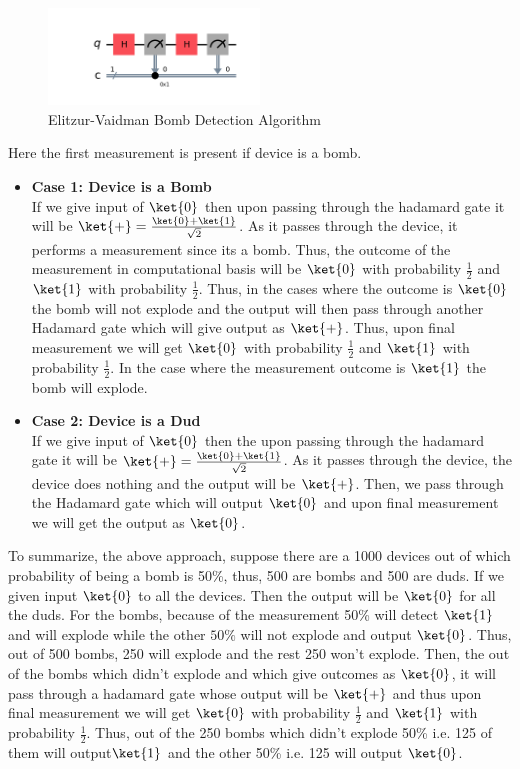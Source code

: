\documentclass[12pt, oneside]{book}
\theoremstyle{definition}
\theoremstyle{definition}
\theoremstyle{remark}
\begin{document}
\begin{enumerate}
    \begin{figure}[H]
        \centering
        \includegraphics[width=0.5\textwidth]{../images/elitzur-vaidman.png}
        \caption{Elitzur-Vaidman Bomb Detection Algorithm}
        \label{fig:elitzur-vaidman}
    \end{figure}
    Here the first measurement is present if device is a bomb.
    \begin{itemize}
        \item \textbf{Case 1: Device is a Bomb}\\
        If we give input of $\ket{0}$ then upon passing through the hadamard gate it will be $\ket{+}=\frac{\ket{0}+\ket{1}}{\sqrt{2}}$. As it passes through the device,
        it performs a measurement since its a bomb. Thus, the outcome of the measurement in computational basis will be $\ket{0}$ with probability $\frac{1}{2}$ and $\ket{1}$ with probability $\frac{1}{2}$.
        Thus, in the cases where the outcome is $\ket{0}$ the bomb will not explode and the output will then pass through another Hadamard gate which will give output as $\ket{+}$. Thus, upon final measurement we will get 
        $\ket{0}$ with probability $\frac{1}{2}$ and $\ket{1}$ with probability $\frac{1}{2}$. In the case where the measurement outcome is $\ket{1}$ the bomb will explode.

        \item \textbf{Case 2: Device is a Dud}\\
        If we give input of $\ket{0}$ then the upon passing through the hadamard gate it will be $\ket{+}=\frac{\ket{0}+\ket{1}}{\sqrt{2}}$. As it passes through the device, the device does nothing and the output will be $\ket{+}$.
        Then, we pass through the Hadamard gate which will output $\ket{0}$ and upon final measurement we will get the output as $\ket{0}$.
    \end{itemize}
    To summarize, the above approach, suppose there are a 1000 devices out of which probability of being a bomb is 50\%, thus, 500 are bombs and 500 are duds. If we given input $\ket{0}$ to all the devices. Then the output will be $\ket{0}$ for all the duds. 
    For the bombs, because of the measurement 50\% will detect $\ket{1}$ and will explode while the other $50\%$ will not explode and output $\ket{0}$. Thus, out of 500 bombs, 250 will explode and the rest 250 won't explode. 
    Then, the out of the bombs which didn't explode and which give outcomes as $\ket{0}$, it will pass through a hadamard gate whose output will be $\ket{+}$ and thus upon final measurement we will get $\ket{0}$ with probability $\frac{1}{2}$ and $\ket{1}$ with probability $\frac{1}{2}$.
    Thus, out of the 250 bombs which didn't explode 50\% i.e. 125 of them will output$\ket{1}$ and the other 50\% i.e. 125 will output $\ket{0}$. 


\end{enumerate}
\end{document}
